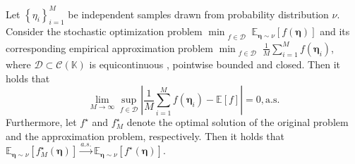 \begin{lemma}\label{lem: stochastic-consistency-for-infinite-dim}
    Let $\left\{\eta_i\right\}_{i=1}^M$ be independent samples drawn from probability distribution $\nu$. Consider the stochastic optimization problem $\min_{\substack{f\in\mathcal{D}}} \mathbb{E}_{\bm{\eta} \sim \nu}[f(\bm{\eta})]$ and its corresponding empirical approximation problem $\min_{\substack{f\in\mathcal{D}}} \frac{1}{M}\sum_{i=1}^{M} f(\bm\eta_i)$, where $\mathcal{D}\subset \mathcal C(\mathbb{K})$ is equicontinuous \citep[Def~11.27]{rudin1987real}, pointwise bounded and closed.
    Then it holds that 
    \begin{equation*}
        \lim_{M\rightarrow\infty}\sup_{f\in\mathcal{D}}\left|\frac{1}{M}\sum_{i=1}^{M} f(\bm\eta_i)-\mathbb{E}[f]\right|=0, \text{a.s.}
    \end{equation*}
    Furthermore, let $f^\star$ and $f^\star_M$ denote the optimal solution of the original problem and the approximation problem, respectively. Then it holds that $\mathbb{E}_{\bm{\eta}\sim \nu}[f^\star_M(\bm{\eta})] \xrightarrow{a.s.}\mathbb{E}_{\bm{\eta}\sim \nu}[f^\star(\bm{\eta})]$. 
\end{lemma}
